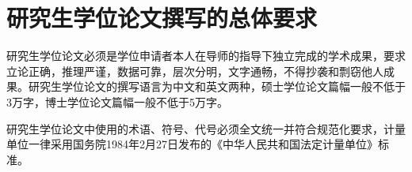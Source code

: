 
\chapter{研究生学位论文撰写的总体要求}
研究生学位论文必须是学位申请者本人在导师的指导下独立完成的学术成果，要求立论正确，推理严谨，数据可靠，层次分明，文字通畅，不得抄袭和剽窃他人成果。研究生学位论文的撰写语言为中文和英文两种，硕士学位论文篇幅一般不低于3万字，博士学位论文篇幅一般不低于5万字。

研究生学位论文中使用的术语、符号、代号必须全文统一并符合规范化要求，计量单位一律采用国务院1984年2月27日发布的《中华人民共和国法定计量单位》标准。

